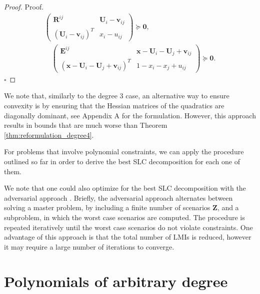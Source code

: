 \documentclass[opre,nonblindrev]{informs3} %
\begin{document}
\begin{proof}{Proof. }
\begin{align*}
\begin{pmatrix}
                \boldsymbol{R}^{ij} & \boldsymbol{U}_i-\boldsymbol{v}_{ij} \\
                \left(\boldsymbol{U}_i-\boldsymbol{v}_{ij}\right)^T & x_i-u_{ij}
           \end{pmatrix} \succeq \boldsymbol{0}, \\  
           \quad \begin{pmatrix}
                \boldsymbol{E}^{ij} & \boldsymbol{x}-\boldsymbol{U}_i-\boldsymbol{U}_j+\boldsymbol{v}_{ij} \\
                \left( \boldsymbol{x}-\boldsymbol{U}_i-\boldsymbol{U}_j+\boldsymbol{v}_{ij} \right)^T & 1- x_i -x_j + u_{ij}
           \end{pmatrix} \succeq \boldsymbol{0}.
\end{align*} \hfill $\square$
\end{proof}  
We note that, similarly to the degree 3 case, an alternative way to ensure convexity is by ensuring that the Hessian matrices of the quadratics are diagonally dominant, see Appendix A for the formulation. However, this approach results in bounds that are much worse than Theorem \eqref{thm:reformulation_degree4}. 

\begin{remark}
For problems that involve polynomial constraints, we can apply the procedure outlined so far in order to derive the best SLC decomposition for each one of them.
\end{remark} 

\begin{remark}
    We note that one could also optimize for the best SLC decomposition with the adversarial approach \cite{mutapcic2009cutting}. Briefly, the adversarial approach alternates between solving a master problem, by including a finite number of scenarios $\boldsymbol{Z}$, and a subproblem, in which the worst case scenarios are computed. The procedure is repeated iteratively until the worst case scenarios do not violate constraints. One advantage of this approach is that the total number of LMIs is reduced, however it may require a large number of iterations to converge. 
\end{remark}


\section{Polynomials of arbitrary degree}  
\end{document}
